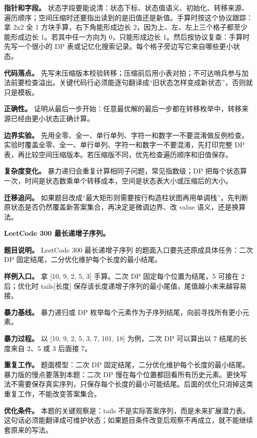 \textbf{指针和字段。} 状态字段要能说清：状态下标、状态值语义、初始化、转移来源、遍历顺序；空间压缩时还要指出读到的是旧值还是新值。手算时按这个协议跟踪：拿 2x2 全 1 方块手算，右下角能形成边长 2，因为上、左、左上三个格子都至少能形成边长 1。若其中任一方向为 0，只能形成边长 1。然后按协议复查：手算时先写一个很小的 DP 表或记忆化搜索记录。每个格子旁边写它来自哪些更小状态。

\textbf{代码落点。} 先写未压缩版本校验转移；压缩前后用小表对拍；不可达哨兵参与加法前要检查溢出。关键代码行必须能逐句翻译成“旧状态怎样变成新状态”，否则就只是模板。

\textbf{正确性。} 证明从最后一步开始：任意最优解的最后一步都在转移枚举中，转移来源已经由更小状态正确计算。

\textbf{边界实验。} 先用全零、全一、单行单列、字符一和数字一不要混淆做反例检查。实验时覆盖全零、全一、单行单列、字符一和数字一不要混淆，先打印完整 DP 表，再比较空间压缩版本。若压缩版不同，优先检查遍历顺序和旧值保存。

\textbf{复杂度变化。} 暴力递归会重复计算相同子问题，常见指数级；DP 把每个状态算一次，时间是状态数乘单个转移成本，空间是状态表大小或压缩后的大小。

\textbf{迁移追问。} 如果题目改成“最大矩形则需要按行构造柱状图再用单调栈”，先判断原状态是否仍然覆盖新答案集合，再决定是微调边界、改 value 语义，还是换算法。

\noindent\textbf{LeetCode 300 最长递增子序列。}

\textbf{题目说明。} LeetCode 300 最长递增子序列 的题面入口要先还原成具体任务：二次 DP 固定结尾，二分优化维护每个长度的最小结尾。

\textbf{样例入口。} 拿 [10, 9, 2, 5, 3] 手算。二次 DP 固定每个位置为结尾，5 可接在 2 后；优化时 tails[长度] 保存该长度递增子序列的最小尾值，尾值越小未来越容易接。

\textbf{暴力基线。} 暴力递归或 DP 枚举每个元素作为子序列结尾，向前寻找所有更小元素。

\textbf{暴力过程。} 以 [10, 9, 2, 5, 3, 7, 101, 18] 为例，二次 DP 可以算出以 7 结尾的长度来自 2、5 或 3 后面接 7。

\textbf{重复工作。} 题面模型：二次 DP 固定结尾，二分优化维护每个长度的最小结尾。暴力版的慢点要落到本题：二次 DP 慢在每个位置都回看所有历史元素。更快写法不需要保存真实序列，只保存每个长度的最小可能结尾。后面的优化只消掉这类重复工作，不能改变答案集合。

\textbf{优化条件。} 本题的关键观察是：tails 不是实际答案序列，而是未来扩展潜力表。这句话必须能翻译成可维护状态；如果题目条件改变后观察不再成立，就不能继续套原来的写法。

